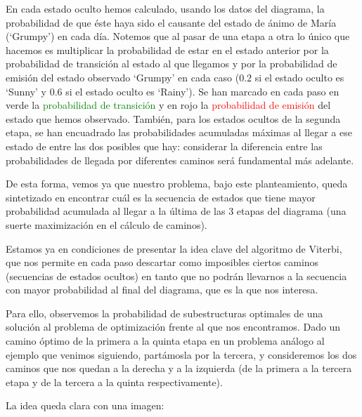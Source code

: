 \documentclass{article}
\begin{document}
En cada estado oculto hemos calculado, usando los datos del diagrama,
la probabilidad de que éste haya sido el causante del estado
de ánimo de María (`Grumpy') en cada día. Notemos que al
pasar de una etapa a otra lo único que hacemos es multiplicar
la probabilidad de estar en el estado anterior por la probabilidad de transición al estado al que llegamos y por la probabilidad
de emisión del estado observado `Grumpy' en cada caso ($0.2$ si
el estado oculto es `Sunny' y $0.6$ si el estado oculto
es `Rainy'). Se han marcado en cada paso en verde la \textcolor{green}{probabilidad
de transición} y en rojo la \textcolor{red}{probabilidad de emisión} del estado
que hemos observado. También, para los estados ocultos
de la segunda etapa, se han encuadrado las probabilidades
acumuladas máximas al llegar a ese estado de entre las dos
posibles que hay: considerar la diferencia entre las probabilidades de llegada por diferentes caminos será fundamental
más adelante.

De esta forma, vemos ya que nuestro problema, bajo este planteamiento, queda sintetizado en encontrar cuál es la secuencia
de estados que tiene mayor probabilidad acumulada al llegar a la última de las 3 etapas del diagrama (una suerte maximización
en el cálculo de caminos). 

\medskip

Estamos ya en condiciones de presentar la idea clave del algoritmo de Viterbi, que nos permite en cada paso descartar como
imposibles ciertos caminos (secuencias de estados ocultos) en
tanto que no podrán llevarnos a la secuencia con mayor
probabilidad al final del diagrama, que es la que nos interesa.

Para ello, observemos la probabilidad de subestructuras
optimales de una solución al problema de optimización frente
al que nos encontramos. Dado un camino óptimo de la primera
a la quinta etapa en un problema análogo al ejemplo que venimos siguiendo, partámosla por la tercera, y consideremos
los dos caminos que nos quedan a la derecha y a la izquierda
(de la primera a la tercera etapa y de la tercera a la quinta
respectivamente).

La idea queda clara con una imagen:

\end{document}

